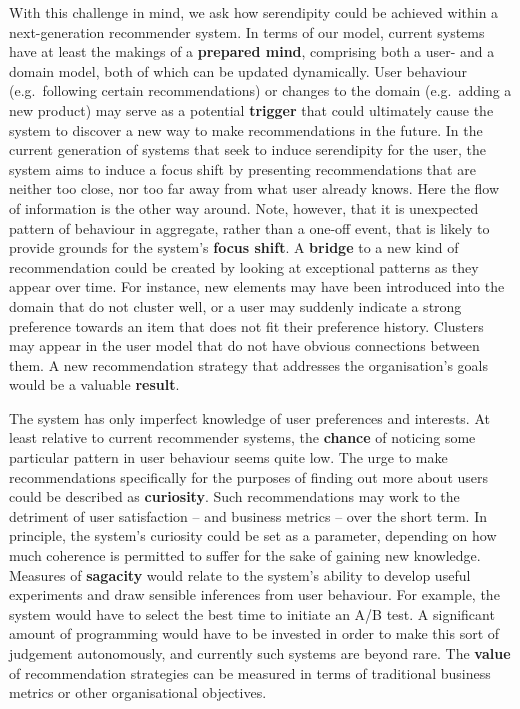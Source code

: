 With this challenge in mind, we ask how serendipity could be achieved
within a next-generation recommender system. In terms of our model,
current systems have at least the makings of a \textbf{prepared mind},
comprising both a user- and a domain model, both of which can be
updated dynamically.  User behaviour (e.g.~following certain
recommendations) or changes to the domain (e.g.~adding a new product)
may serve as a potential \textbf{trigger} that could ultimately cause
the system to discover a new way to make recommendations in the
future.  In the current generation of systems that seek to induce
serendipity for the user, the system aims to induce a focus shift by
presenting recommendations that are neither too close, nor too far
away from what user already knows.  Here the flow of information is
the other way around.  Note, however, that it is unexpected pattern of
behaviour in aggregate, rather than a one-off event, that is likely to
provide grounds for the system's \textbf{focus shift}.  A
\textbf{bridge} to a new kind of recommendation could be created by
looking at exceptional patterns as they appear over time.  For
instance, new elements may have been introduced into the domain that
do not cluster well, or a user may suddenly indicate a strong
preference towards an item that does not fit their preference history.
Clusters may appear in the user model that do not have obvious
connections between them.  A new recommendation strategy that
addresses the organisation's goals would be a valuable
\textbf{result}.

The system has only imperfect knowledge of user preferences and
interests.  At least relative to current recommender systems, the
\textbf{chance} of noticing some particular pattern in user behaviour
seems quite low.  The urge to make recommendations specifically for
the purposes of finding out more about users could be described as
\textbf{curiosity}.  Such recommendations may work to the detriment of
user satisfaction -- and business metrics -- over the short term.  In
principle, the system's curiosity could be set as a parameter,
depending on how much coherence is permitted to suffer for the sake of
gaining new knowledge.  Measures of \textbf{sagacity} would relate to
the system's ability to develop useful experiments and draw sensible
inferences from user behaviour.  For example, the system would have to
select the best time to initiate an A/B test.  A significant amount of
programming would have to be invested in order to make this sort of
judgement autonomously, and currently such systems are beyond rare.
The \textbf{value} of recommendation strategies can be measured in
terms of traditional business metrics or other organisational
objectives.

